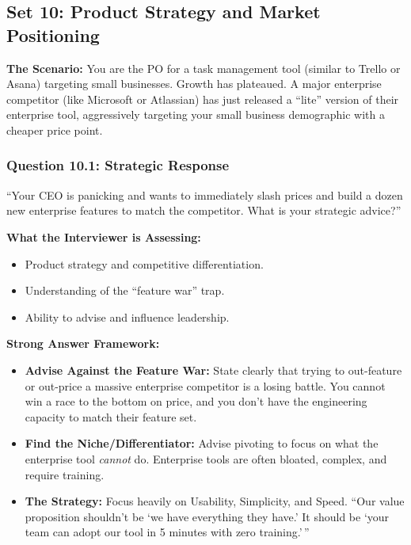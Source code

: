 \bigskip

\subsection{Set 10: Product Strategy and Market
Positioning}\label{set-10-product-strategy-and-market-positioning}

\textbf{The Scenario:} You are the PO for a task management tool
(similar to Trello or Asana) targeting small businesses. Growth has
plateaued. A major enterprise competitor (like Microsoft or Atlassian)
has just released a ``lite'' version of their enterprise tool,
aggressively targeting your small business demographic with a cheaper
price point.

\subsubsection{Question 10.1: Strategic
Response}\label{question-10.1-strategic-response}

``Your CEO is panicking and wants to immediately slash prices and build
a dozen new enterprise features to match the competitor. What is your
strategic advice?''

\textbf{What the Interviewer is Assessing:}

\begin{itemize}
\tightlist
\item
  Product strategy and competitive differentiation.
\item
  Understanding of the ``feature war'' trap.
\item
  Ability to advise and influence leadership.
\end{itemize}

\textbf{Strong Answer Framework:}

\begin{itemize}
\tightlist
\item
  \textbf{Advise Against the Feature War:} State clearly that trying to
  out-feature or out-price a massive enterprise competitor is a losing
  battle. You cannot win a race to the bottom on price, and you don't
  have the engineering capacity to match their feature set.
\item
  \textbf{Find the Niche/Differentiator:} Advise pivoting to focus on
  what the enterprise tool \emph{cannot} do. Enterprise tools are often
  bloated, complex, and require training.
\item
  \textbf{The Strategy:} Focus heavily on Usability, Simplicity, and
  Speed. ``Our value proposition shouldn't be `we have everything they
  have.' It should be `your team can adopt our tool in 5 minutes with
  zero training.'\,''
\end{itemize}

